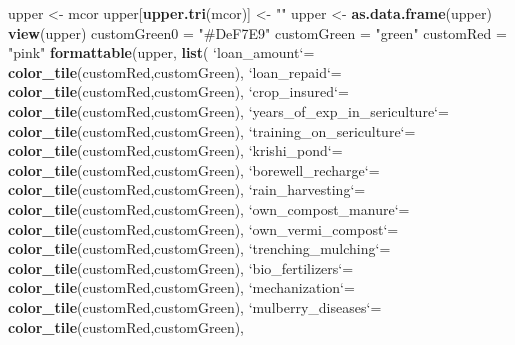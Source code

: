 \documentclass[
]{article}
\newenvironment{Shaded}{\begin{snugshade}}{\end{snugshade}}
\newcommand{\DataTypeTok}[1]{\textcolor[rgb]{0.13,0.29,0.53}{#1}}
\newcommand{\KeywordTok}[1]{\textcolor[rgb]{0.13,0.29,0.53}{\textbf{#1}}}
\newcommand{\NormalTok}[1]{#1}
\newcommand{\StringTok}[1]{\textcolor[rgb]{0.31,0.60,0.02}{#1}}
\begin{document}
\begin{Shaded}
\begin{Highlighting}[]
\NormalTok{upper <-}\StringTok{ }\NormalTok{mcor}
\NormalTok{upper[}\KeywordTok{upper.tri}\NormalTok{(mcor)] <-}\StringTok{ ""}
\NormalTok{upper <-}\StringTok{ }\KeywordTok{as.data.frame}\NormalTok{(upper)}
\KeywordTok{view}\NormalTok{(upper)}
\NormalTok{customGreen0 =}\StringTok{ "#DeF7E9"}
\NormalTok{customGreen =}\StringTok{ "green"}
\NormalTok{customRed =}\StringTok{ "pink"}
\KeywordTok{formattable}\NormalTok{(upper, }\KeywordTok{list}\NormalTok{(}
            \StringTok{`}\DataTypeTok{loan_amount}\StringTok{`}\NormalTok{=}\StringTok{ }\KeywordTok{color_tile}\NormalTok{(customRed,customGreen),}
            \StringTok{`}\DataTypeTok{loan_repaid}\StringTok{`}\NormalTok{=}\StringTok{ }\KeywordTok{color_tile}\NormalTok{(customRed,customGreen),}
            \StringTok{`}\DataTypeTok{crop_insured}\StringTok{`}\NormalTok{=}\StringTok{ }\KeywordTok{color_tile}\NormalTok{(customRed,customGreen),}
            \StringTok{`}\DataTypeTok{years_of_exp_in_sericulture}\StringTok{`}\NormalTok{=}\StringTok{ }\KeywordTok{color_tile}\NormalTok{(customRed,customGreen),}
            \StringTok{`}\DataTypeTok{training_on_sericulture}\StringTok{`}\NormalTok{=}\StringTok{ }\KeywordTok{color_tile}\NormalTok{(customRed,customGreen),}
            \StringTok{`}\DataTypeTok{krishi_pond}\StringTok{`}\NormalTok{=}\StringTok{ }\KeywordTok{color_tile}\NormalTok{(customRed,customGreen),}
            \StringTok{`}\DataTypeTok{borewell_recharge}\StringTok{`}\NormalTok{=}\StringTok{ }\KeywordTok{color_tile}\NormalTok{(customRed,customGreen),}
            \StringTok{`}\DataTypeTok{rain_harvesting}\StringTok{`}\NormalTok{=}\StringTok{ }\KeywordTok{color_tile}\NormalTok{(customRed,customGreen),}
            \StringTok{`}\DataTypeTok{own_compost_manure}\StringTok{`}\NormalTok{=}\StringTok{ }\KeywordTok{color_tile}\NormalTok{(customRed,customGreen),}
            \StringTok{`}\DataTypeTok{own_vermi_compost}\StringTok{`}\NormalTok{=}\StringTok{ }\KeywordTok{color_tile}\NormalTok{(customRed,customGreen),}
            \StringTok{`}\DataTypeTok{trenching_mulching}\StringTok{`}\NormalTok{=}\StringTok{ }\KeywordTok{color_tile}\NormalTok{(customRed,customGreen),}
            \StringTok{`}\DataTypeTok{bio_fertilizers}\StringTok{`}\NormalTok{=}\StringTok{ }\KeywordTok{color_tile}\NormalTok{(customRed,customGreen),}
            \StringTok{`}\DataTypeTok{mechanization}\StringTok{`}\NormalTok{=}\StringTok{ }\KeywordTok{color_tile}\NormalTok{(customRed,customGreen),}
            \StringTok{`}\DataTypeTok{mulberry_diseases}\StringTok{`}\NormalTok{=}\StringTok{ }\KeywordTok{color_tile}\NormalTok{(customRed,customGreen),}

\end{Highlighting}
\end{Shaded}
\end{document}

